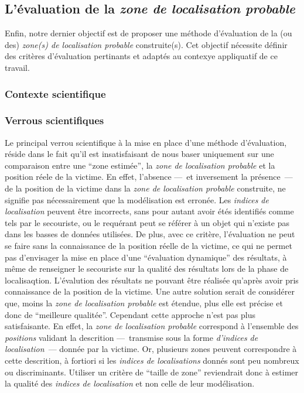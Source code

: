 \subsection{L'évaluation de la \emph{zone de localisation probable}}
\label{subsec:2-1-5}

Enfin, notre dernier objectif est de proposer une méthode d'évaluation
de la (ou des) \emph{zone(s) de localisation probable}  construite(s). Cet
objectif nécessite définir des critères d'évaluation pertinants et
adaptés au contexye appliquatif de ce travail.


\subsubsection{Contexte scientifique}

\subsubsection{Verrous scientifiques}

Le principal verrou scientifique à la mise en place d'une méthode
d'évaluation, réside dans le fait qu'il est insatisfaisant de nous
baser uniquement sur une comparaison entre une \enquote{zone estimée},
\ie la \emph{zone de localisation probable} et la position réele de la
victime. En effet, l'absence ---~et inversement la présence~--- de la
position de la victime dans la \emph{zone de localisation probable}
construite, ne signifie pas nécessairement que la modélisation est
erronée. Les \emph{indices de localisation} peuvent être incorrects,
sans pour autant avoir étés identifiés comme tels par le secouriste,
ou le requérant peut se référer à un objet qui n'existe pas dans les
basses de données utilisées. De plus, avec ce critère, l'évaluation ne
peut se faire sans la connaissance de la position réelle de la
victime, ce qui ne permet pas d'envisager la mise en place d'une
\enquote{évaluation dynamique} des résultats, à même de renseigner le
secouriste sur la qualité des résultats lors de la phase de
localisaqtion. L'évalution des résultats ne pouvant être réalisée
qu'après avoir pris connaissance de la position de la victime. Une
autre solution serait de considérer que, moins la \emph{zone de
  localisation probable} est étendue, plus elle est précise et donc de
\enquote{meilleure qualitée}. Cependant cette approche n'est pas plus
satisfaisante.  En effet, la \emph{zone de localisation probable}
correspond à l'ensemble des \emph{positions} validant la descrition
---~transmise sous la forme \emph{d'indices de localisation}~---
donnée par la victime. Or, plusieurs zones peuvent correspondre à
cette descrition, à fortiori si les \emph{indices de localisations}
donnés sont peu nombreux ou discriminants. Utiliser un critère de
\enquote{taille de zone} reviendrait donc à estimer la qualité des
\emph{indices de localisation} et non celle de leur modélisation.

